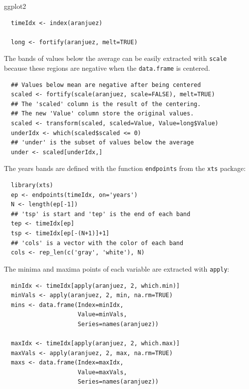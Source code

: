 \documentclass[xcolor={usenames,svgnames,dvipsnames}]{beamer}
\begin{document}
\begin{frame}[fragile,label=sec-2-2-3]{ggplot2}
 \lstset{language=R,label= ,caption= ,numbers=none}
\begin{lstlisting}
  timeIdx <- index(aranjuez)
  
  long <- fortify(aranjuez, melt=TRUE)
\end{lstlisting}
\end{frame}
\begin{frame}[fragile,label=sec-2-2-4]{The bands of values below the average can be easily extracted with}
 \texttt{scale} because these regions are negative when the \texttt{data.frame} is
centered.
\lstset{language=R,label= ,caption= ,numbers=none}
\begin{lstlisting}
  ## Values below mean are negative after being centered
  scaled <- fortify(scale(aranjuez, scale=FALSE), melt=TRUE)
  ## The 'scaled' column is the result of the centering.
  ## The new 'Value' column store the original values.
  scaled <- transform(scaled, scaled=Value, Value=long$Value)
  underIdx <- which(scaled$scaled <= 0)
  ## 'under' is the subset of values below the average
  under <- scaled[underIdx,]
\end{lstlisting}
\end{frame}

\begin{frame}[fragile,label=sec-2-2-5]{The years bands are defined with the function \texttt{endpoints} from the}
 \texttt{xts} package:

\lstset{language=R,label= ,caption= ,numbers=none}
\begin{lstlisting}
  library(xts)
  ep <- endpoints(timeIdx, on='years')
  N <- length(ep[-1])
  ## 'tsp' is start and 'tep' is the end of each band
  tep <- timeIdx[ep]
  tsp <- timeIdx[ep[-(N+1)]+1]
  ## 'cols' is a vector with the color of each band
  cols <- rep_len(c('gray', 'white'), N)
\end{lstlisting}
\end{frame}
\begin{frame}[fragile,label=sec-2-2-6]{The minima and maxima points of each variable are extracted with}
 \texttt{apply}:
\lstset{language=R,label= ,caption= ,numbers=none}
\begin{lstlisting}
  minIdx <- timeIdx[apply(aranjuez, 2, which.min)]
  minVals <- apply(aranjuez, 2, min, na.rm=TRUE)
  mins <- data.frame(Index=minIdx,
                     Value=minVals,
                     Series=names(aranjuez))
  
  maxIdx <- timeIdx[apply(aranjuez, 2, which.max)]
  maxVals <- apply(aranjuez, 2, max, na.rm=TRUE)
  maxs <- data.frame(Index=maxIdx,
                     Value=maxVals,
                     Series=names(aranjuez))
\end{lstlisting}
\end{frame}
\end{document}
